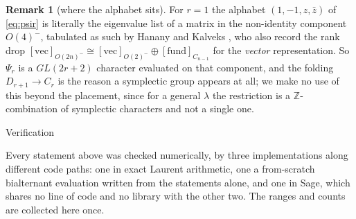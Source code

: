 \documentclass[11pt,reqno]{amsart}
\makeatletter
\renewcommand\section{\@startsection{section}{1}%
  \z@{\linespacing\@plus\linespacing}{.5\linespacing}%
  {\normalfont\large\bfseries\centering}}
\theoremstyle{plain}
\theoremstyle{definition}
\newtheorem{remark}[theorem]{Remark}
\newcommand{\ZZ}{\mathbb{Z}}
\makeatother
\begin{document}
\begin{remark}[where the alphabet sits]
For $r=1$ the alphabet $(1,-1,z,\bar z)$ of \eqref{eq:psir} is literally the eigenvalue list of a
matrix in the non-identity component $O(4)^{-}$, tabulated as such by Hanany and Kalveks
\cite[Table 7]{HK16}, who also record the rank drop
$[\mathrm{vec}]_{O(2n)^{-}}\cong[\mathrm{vec}]_{O(2)^{-}}\oplus[\mathrm{fund}]_{C_{n-1}}$ for the
\emph{vector} representation. So $\Psi_r$ is a $GL(2r+2)$ character evaluated on that component, and
the folding $D_{r+1}\to C_r$ is the reason a symplectic group appears at all; we make no use of this
beyond the placement, since for a general $\lambda$ the restriction is a $\ZZ$-combination of
symplectic characters and not a single one.
\end{remark}

\section{Verification}\label{sec:verif}

Every statement above was checked numerically, by three implementations along different code paths:
one in exact Laurent arithmetic, one a from-scratch bialternant evaluation written from the
statements alone, and one in Sage, which shares no line of code and no library with the other two.
The ranges and counts are collected here once.
\end{document}
